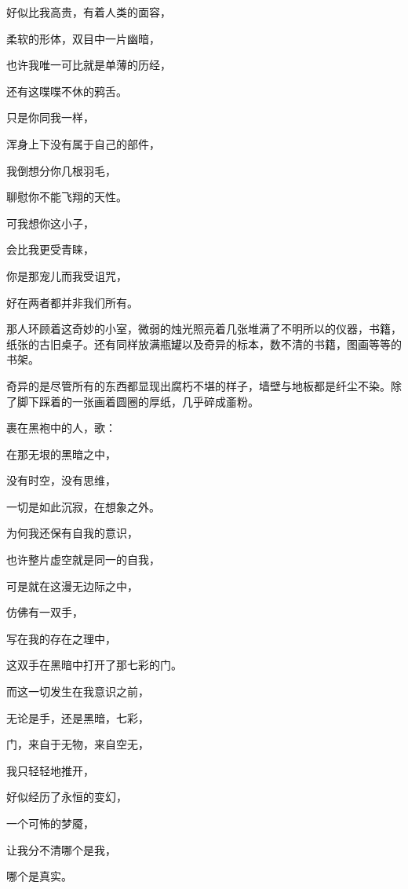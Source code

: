 \documentclass[UTF8]{article}
\begin{document}
\par 好似比我高贵，有着人类的面容，
\par 柔软的形体，双目中一片幽暗，
\par 也许我唯一可比就是单薄的历经，
\par 还有这喋喋不休的鸦舌。
\par 只是你同我一样，
\par 浑身上下没有属于自己的部件，
\par 我倒想分你几根羽毛，
\par 聊慰你不能飞翔的天性。
\par 可我想你这小子，
\par 会比我更受青睐，
\par 你是那宠儿而我受诅咒，
\par 好在两者都并非我们所有。
\\[0.6cm]
\par 那人环顾着这奇妙的小室，微弱的烛光照亮着几张堆满了不明所以的仪器，书籍，纸张的古旧桌子。还有同样放满瓶罐以及奇异的标本，数不清的书籍，图画等等的书架。
\par 奇异的是尽管所有的东西都显现出腐朽不堪的样子，墙壁与地板都是纤尘不染。除了脚下踩着的一张画着圆圈的厚纸，几乎碎成齑粉。
\\[0.6cm]
\par 裹在黑袍中的人，歌：
\\[0.6cm]
\par 在那无垠的黑暗之中，
\par 没有时空，没有思维，
\par 一切是如此沉寂，在想象之外。
\par 为何我还保有自我的意识，
\par 也许整片虚空就是同一的自我，
\par 可是就在这漫无边际之中，
\par 仿佛有一双手，
\par 写在我的存在之理中，
\par 这双手在黑暗中打开了那七彩的门。
\par 而这一切发生在我意识之前，
\par 无论是手，还是黑暗，七彩，
\par 门，来自于无物，来自空无，
\par 我只轻轻地推开，
\par 好似经历了永恒的变幻，
\par 一个可怖的梦魇，
\par 让我分不清哪个是我，
\par 哪个是真实。
\\[0.6cm]
\end{document}

